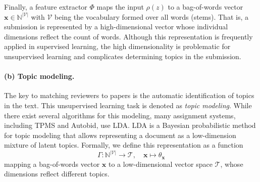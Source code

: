 \documentclass[letterpaper,twocolumn,10pt]{article}
\newcommand{\bow}{\textbf{x}}
\newcommand{\vocabulary}{\mathcal{V}}
\newcommand{\topicspace}{\mathcal{T}}
\newcommand{\extractor}{\Phi}
\newcommand{\topicextractor}{\Gamma}
\newcommand{\topicdocumentdist}{\theta}
\newcommand{\preprocessing}{\ensuremath{\rho}\xspace}
\newcommand{\inputpdf}{\ensuremath{z}\xspace}
\begin{document}
Finally, a feature extractor $\extractor$ maps the input $\preprocessing(\inputpdf)$ to a bag-of-words vector $\bow \in \mathbb{N}^{|\vocabulary|}$ with $\vocabulary$ being the vocabulary formed over all words (stems). That is, a submission is represented by a high-dimensional vector whose individual dimensions reflect the count of words.  Although this representation is frequently applied in supervised learning, the high {dimensionality\EndAccSupp{}} is problematic for {unsupervised\EndAccSupp{}} learning and complicates determining topics in the submission.

\paragraph{(b) Topic modeling.}
The key to matching reviewers to papers is the automatic identification of topics in the text. This {unsupervised\EndAccSupp{}} learning task is denoted as \emph{topic modeling}. While there exist several algorithms for this modeling, many assignment systems, including \ac{TPMS} and Autobid, use \ac{LDA}. 
\ac{LDA} is a Bayesian probabilistic method for topic modeling that allows representing a document as a low-dimension {mixture\EndAccSupp{}} of latent topics. 
Formally, we define this representation as a function
\[ 
   \topicextractor\colon \mathbb{N}^{\left|\vocabulary\right|} \longrightarrow \topicspace, \quad 
   \bow\mapsto \topicdocumentdist_\bow
\]
mapping a bag-of-words vector $\bow$ to a low-dimensional vector space $\topicspace$, whose dimensions reflect different  topics.
\end{document}
